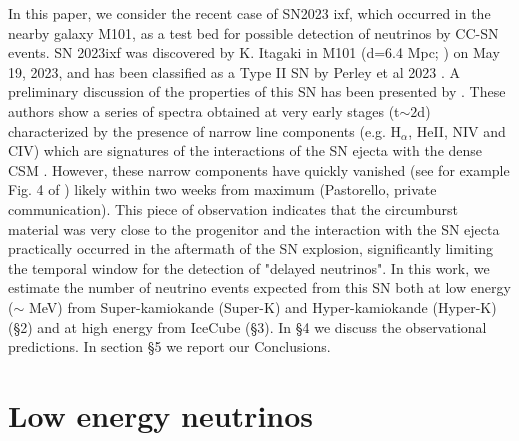\documentclass[twocolumn]{aastex631}
\begin{document}
In this paper, we consider the recent case of SN2023 ixf, which occurred in the nearby galaxy M101, as a test bed for possible detection of neutrinos by CC-SN events. SN 2023ixf was discovered by K. Itagaki in M101 (d=6.4 Mpc; \citep{Shappee2011}) on May 19, 2023, and has been classified as a Type II SN by Perley et al 2023 \citep{Perley2023}. A preliminary discussion of the properties of this SN has been presented by \cite{Yamanaka2023}. These authors show a series of spectra obtained at very early stages (t$\sim 2$d) characterized by the presence of narrow line components (e.g. H$_\alpha$, HeII, NIV and CIV) which are signatures of the interactions of the SN ejecta with the dense CSM \citep{Neustadt2023,Cappellaro2015,Jacobson-Galan2023} . However, these narrow components have quickly vanished (see for example Fig. 4 of \cite{Yamanaka2023}) likely within two weeks from maximum (Pastorello, private communication). This piece of observation  indicates that the circumburst material was very close to the progenitor and the interaction with the SN ejecta practically occurred in the aftermath of the SN explosion, significantly limiting the temporal window for the detection of "delayed neutrinos". In this work, we estimate the number of neutrino events expected from this SN both at low energy ($\sim$ MeV) from Super-kamiokande (Super-K) and Hyper-kamiokande (Hyper-K) (§2) and at high energy from IceCube (§3). In §4 we discuss the observational predictions. In section §5 we report our Conclusions. 

\section{Low energy neutrinos}
\end{document}

